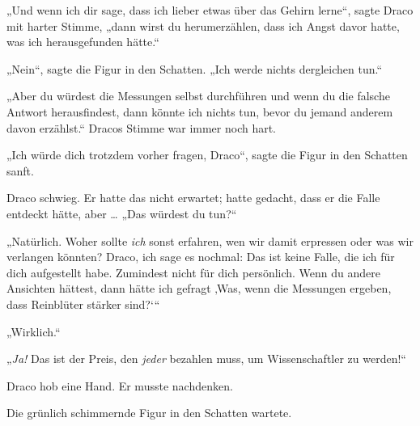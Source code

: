 „Und wenn ich dir sage, dass ich lieber etwas über das Gehirn lerne“, sagte Draco mit harter Stimme, „dann wirst du herumerzählen, dass ich Angst davor hatte, was ich herausgefunden hätte.“

„Nein“, sagte die Figur in den Schatten.
„Ich werde nichts dergleichen tun.“

„Aber du würdest die Messungen selbst durchführen und wenn du die falsche Antwort herausfindest, dann könnte ich nichts tun, bevor du jemand anderem davon erzählst.“ Dracos Stimme war immer noch hart.

„Ich würde dich trotzdem vorher fragen, Draco“, sagte die Figur in den Schatten sanft.

Draco schwieg. Er hatte das nicht erwartet; hatte gedacht, dass er die Falle entdeckt hätte, aber …
„Das würdest du tun?“

„Natürlich. Woher sollte \emph{ich} sonst erfahren, wen wir damit erpressen oder was wir verlangen könnten? Draco, ich sage es nochmal: Das ist keine Falle, die ich für dich aufgestellt habe. Zumindest nicht für dich persönlich. Wenn du andere Ansichten hättest, dann hätte ich gefragt ‚Was, wenn die Messungen ergeben, dass Reinblüter stärker sind?‘“

„Wirklich.“

„\emph{Ja!} Das ist der Preis, den \emph{jeder} bezahlen muss, um Wissenschaftler zu werden!“

Draco hob eine Hand. Er musste nachdenken.

Die grünlich schimmernde Figur in den Schatten wartete.

